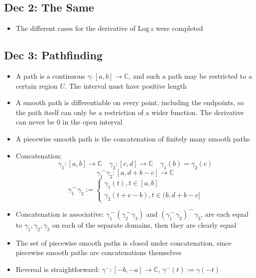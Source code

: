 \documentclass[10pt, oneside]{article}
\newcommand{\cat}{^{\,\smallfrown}}
\newcommand{\C}{\mathbb{C}}
\newcommand{\Log}{\text{Log} \,}
\begin{document}
\subsection{Dec 2: The Same}
\begin{itemize}
    \item The different cases for the derivative of $\Log z$ were completed
\end{itemize}

\subsection{Dec 3: Pathfinding}
\begin{itemize}
    \item A path is a continuous $\gamma : [a,b] \rightarrow \C$, and such a path may be restricted to a certain region $U$. The interval must have positive length
    \item A smooth path is differentiable on every point, including the endpoints, so the path itself can only be a restriction of a wider function. The derivative can never be 0 in the open interval
    \item A piecewise smooth path is the concatenation of finitely many smooth paths
    \item Concatenation:
        \[\gamma_1 : [a,b] \rightarrow \C \quad \gamma_2 : [c,d] \rightarrow \C \quad \gamma_1(b) = \gamma_2(c)\]
        \[\gamma_1 \cat \gamma_2 : [a,d+b-c] \rightarrow \C\]
        \[\gamma_1 \cat \gamma_2 := \begin{cases}
            \gamma_1(t), t \in [a,b]\\
            \gamma_2(t+c-b), t \in (b,d+b-c]
        \end{cases}\]
    \item Concatenation is associative: $\gamma_1 \cat(\gamma_2 \cat \gamma_3)$ and $(\gamma_1 \cat \gamma_2) \cat \gamma_3$, are each equal to $\gamma_1, \gamma_2, \gamma_3$ on each of the separate domains, then they are clearly equal
    \item The set of piecewise smooth paths is closed under concatenation, since piecewise smooth paths are concatenations themselves
    \item Reversal is straightforward: $\gamma^- : [-b, -a] \rightarrow \C$, $\gamma^- (t) := \gamma(-t)$
\end{itemize}
\end{document}
